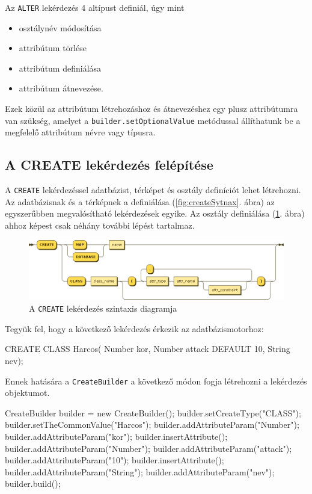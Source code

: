 Az \texttt{ALTER} lekérdezés 4 altípust definiál, úgy mint

\begin{itemize}
\item osztálynév módosítása
\item attribútum törlése
\item attribútum definiálása
\item attribútum átnevezése.
\end{itemize}

Ezek közül az attribútum létrehozáshoz és átnevezéshez egy plusz attribútumra van szükség, amelyet a \texttt{builder.setOptionalValue} metódussal állíthatunk be a megfelelő attribútum névre vagy típusra.

\subsection{A CREATE lekérdezés felépítése}

A \texttt{CREATE} lekérdezéssel adatbázist, térképet és osztály definíciót lehet létrehozni. Az adatbázisnak és a térképnek a definiálása (\ref{fig:createSytnax}. ábra) az egyszerűbben megvalósítható lekérdezések egyike. Az osztály definiálása (\ref{fig:createClassSytnax}. ábra) ahhoz képest csak néhány további lépést tartalmaz.


\begin{figure}[htb]
	\begin{center}
		\includegraphics[scale=0.48]{images/create_expr}
		\caption{A \texttt{CREATE} lekérdezés szintaxis diagramja}
		\label{fig:createClassSytnax}
	\end{center}
\end{figure}

Tegyük fel, hogy a következő lekérdezés érkezik az adatbázismotorhoz:
\begin{sql}
CREATE CLASS Harcos(
Number kor,
Number attack DEFAULT 10,
String nev);
\end{sql}

Ennek hatására a \texttt{CreateBuilder} a következő módon fogja létrehozni a lekérdezés objektumot.

\begin{java}
CreateBuilder builder = new CreateBuilder();
builder.setCreateType("CLASS");
builder.setTheCommonValue("Harcos");
builder.addAttributeParam("Number");
builder.addAttributeParam("kor");
builder.insertAttribute();
builder.addAttributeParam("Number");
builder.addAttributeParam("attack");
builder.addAttributeParam("10");
builder.insertAttribute();
builder.addAttributeParam("String");
builder.addAttributeParam("nev");
builder.build();
\end{java}

